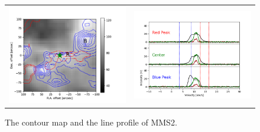 \begin{figure}[h!]
	\begin{center}
		\begin{tabular}{cc}
			\includegraphics[width=7cm]{Orion_12CO2-1_MMS2_rbcontour_400_modified} &   \includegraphics[width=7cm]{Orion_12CO2-1_MMS2_line_profile_400}
		\end{tabular}
		\caption{The contour map and the line profile of MMS2. }
	\label{fig:MMS221}
	\end{center}
\end{figure}

